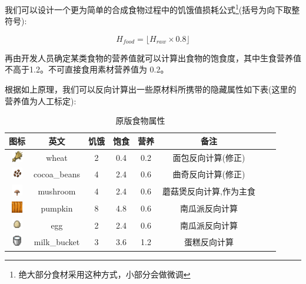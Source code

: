 我们可以设计一个更为简单的合成食物过程中的饥饿值损耗公式\footnote{绝大部分食材采用这种方式，小部分会做微调}(括号为向下取整符号):

\begin{equation}
    H_{food} = \lfloor H_{raw} \times 0.8 \rfloor 
\end{equation}

再由开发人员确定某类食物的营养值就可以计算出食物的饱食度，其中生食营养值不高于1.2。不可直接食用素材营养值为 0.2。

根据如上原理，我们可以反向计算出一些原材料所携带的隐藏属性如下表(这里的营养值为人工标定):

\begin{center}
    \setlength{\tabcolsep}{4mm}
    \begin{longtable}{c|c|ccc|ccc}
        \caption{原版食物属性} \\
        \toprule
        \textbf{图标} & \textbf{英文} & \textbf{饥饿} & \textbf{饱食} & \textbf{营养} & \textbf{备注} \\
        \midrule
        \includegraphics[width=0.5cm,height=0.5cm]{./images/origin/wheat.png} & wheat & 2 & 0.4 & 0.2 & 面包反向计算(修正) \\
        \midrule
        \includegraphics[width=0.5cm,height=0.5cm]{./images/origin/cocoa_beans.png} & cocoa\_beans & 4 & 2.4 & 0.6 & 曲奇反向计算(修正) \\
        \includegraphics[width=0.5cm,height=0.5cm]{./images/origin/brown_mushroom.png} & mushroom & 4 & 2.4 & 0.6 & 蘑菇煲反向计算,作为主食  \\
        \includegraphics[width=0.5cm,height=0.5cm]{./images/origin/pumpkin_side.png} & pumpkin & 8 & 4.8 & 0.6 & 南瓜派反向计算 \\
        \includegraphics[width=0.5cm,height=0.5cm]{./images/origin/egg.png} & egg & 2 & 2.4 & 0.6 & 南瓜派反向计算 \\
        \midrule
        \includegraphics[width=0.5cm,height=0.5cm]{./images/origin/milk_bucket.png} & milk\_bucket & 3 & 3.6 & 1.2 & 蛋糕反向计算 \\

\end{longtable}
\end{center}
